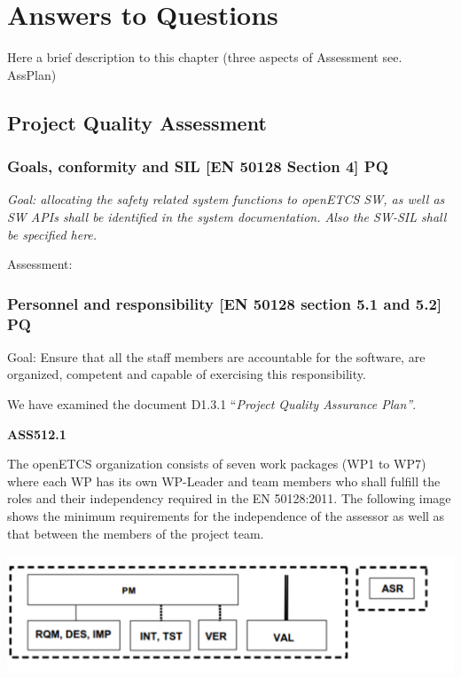 \section{Answers to Questions}

Here a brief description to this chapter (three aspects of Assessment see. AssPlan) 

\subsection{Project Quality Assessment}
\subsubsection{Goals, conformity and SIL [EN 50128 Section 4] PQ}

{\itshape
Goal: allocating the safety related system functions to openETCS SW, as well as SW APIs shall be identified in the
system documentation. Also the SW-SIL shall be specified here. }


\bigskip


\bigskip

Assessment:


\bigskip


\bigskip


\bigskip

\subsubsection{Personnel and responsibility [EN 50128 section 5.1 and 5.2] PQ}
Goal: Ensure that all the staff members are accountable for the software, are organized, competent and capable of
exercising this responsibility.

We have examined the document D1.3.1 ``\textit{Project Quality Assurance Plan''}. 

{\bfseries
ASS512.1}


\bigskip

The openETCS organization consists of seven work packages (WP1 to WP7) where each WP has its own WP-Leader and team
members who shall fulfill the roles and their independency required in the EN 50128:2011. The following image shows the
minimum requirements for the independence of the assessor as well as that between the members of the project team.

 \includegraphics[width=13.626cm,height=3.493cm]{images/organizationalstructure.pdf} 


